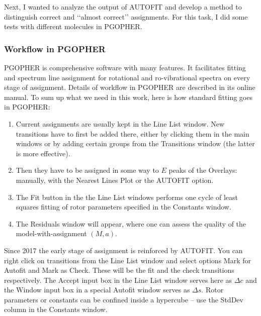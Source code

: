 \documentclass[11pt]{article}
\begin{document}

Next, I wanted to analyze the output of AUTOFIT and develop a method to distinguish correct and \lq\lq{}almost correct\rq\rq{} assignments. For this task, I did some tests with different molecules in PGOPHER. 

\subsubsection{Workflow in PGOPHER}

PGOPHER is comprehensive software with many features. It facilitates fitting and spectrum line assignment for rotational and ro-vibrational spectra on every stage of assignment. Details of workflow in PGOPHER are described in its online manual. To sum up what we need in this work, here is how standard fitting goes in PGOPHER: 
\begin{enumerate}
	\item Current assignments are usually kept in the Line List window. New transitions have to first be added there, either by clicking them in the main windows or by adding certain groups from the Transitions window (the latter is more effective). 
	\item Then they have to be assigned in some way to $E$ peaks of the Overlays: manually, with the Nearest Lines Plot or the AUTOFIT option.
	\item The Fit button in the the Line List windows performs one cycle of least squares fitting of rotor parameters specified in the Constants window.
	\item The Residuals window will appear, where one can assess the quality of the model-with-assignment $(M, a)$.
\end{enumerate}


Since 2017 the early stage of assignment is reinforced by AUTOFIT. You can right click on transitions from the Line List window and select options Mark for Autofit and Mark as Check. These will be the fit and the check transitions respectively. The Accept input box in the Line List window serves here as $\Delta c$ and the Window input box in a special Autofit window serves as $\Delta s$. Rotor parameters or constants can be confined inside a hypercube -- use the StdDev column in the Constants window.
\end{document}
